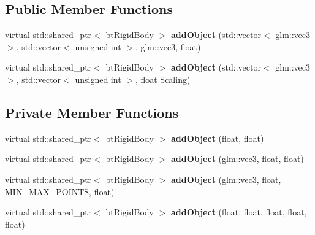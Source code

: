 \subsection*{Public Member Functions}
\begin{DoxyCompactItemize}
\item 
virtual std\+::shared\+\_\+ptr$<$ bt\+Rigid\+Body $>$ {\bfseries add\+Object} (std\+::vector$<$ glm\+::vec3 $>$, std\+::vector$<$ unsigned int $>$, glm\+::vec3, float)\hypertarget{class_physics_1_1_triangle_mesh_physic_object_a60f24807621a18f39c4d12fa3bba6a67}{}\label{class_physics_1_1_triangle_mesh_physic_object_a60f24807621a18f39c4d12fa3bba6a67}

\item 
virtual std\+::shared\+\_\+ptr$<$ bt\+Rigid\+Body $>$ {\bfseries add\+Object} (std\+::vector$<$ glm\+::vec3 $>$, std\+::vector$<$ unsigned int $>$, float Scaling)\hypertarget{class_physics_1_1_triangle_mesh_physic_object_a86750e102d5de3d98c88f36f53070191}{}\label{class_physics_1_1_triangle_mesh_physic_object_a86750e102d5de3d98c88f36f53070191}

\end{DoxyCompactItemize}
\subsection*{Private Member Functions}
\begin{DoxyCompactItemize}
\item 
virtual std\+::shared\+\_\+ptr$<$ bt\+Rigid\+Body $>$ {\bfseries add\+Object} (float, float)\hypertarget{class_physics_1_1_triangle_mesh_physic_object_a331eabf780d6f7c28c7d4433b3ac5f30}{}\label{class_physics_1_1_triangle_mesh_physic_object_a331eabf780d6f7c28c7d4433b3ac5f30}

\item 
virtual std\+::shared\+\_\+ptr$<$ bt\+Rigid\+Body $>$ {\bfseries add\+Object} (glm\+::vec3, float, float)\hypertarget{class_physics_1_1_triangle_mesh_physic_object_af9a3d30b3fc11c58153645800ab43bdc}{}\label{class_physics_1_1_triangle_mesh_physic_object_af9a3d30b3fc11c58153645800ab43bdc}

\item 
virtual std\+::shared\+\_\+ptr$<$ bt\+Rigid\+Body $>$ {\bfseries add\+Object} (glm\+::vec3, float, \hyperlink{struct_m_i_n___m_a_x___p_o_i_n_t_s}{M\+I\+N\+\_\+\+M\+A\+X\+\_\+\+P\+O\+I\+N\+TS}, float)\hypertarget{class_physics_1_1_triangle_mesh_physic_object_a6b4b88cb33616961f8ce55803d7bd2e3}{}\label{class_physics_1_1_triangle_mesh_physic_object_a6b4b88cb33616961f8ce55803d7bd2e3}

\item 
virtual std\+::shared\+\_\+ptr$<$ bt\+Rigid\+Body $>$ {\bfseries add\+Object} (float, float, float, float, float)\hypertarget{class_physics_1_1_triangle_mesh_physic_object_a66a72afa89538cef502e384c9bf973ec}{}\label{class_physics_1_1_triangle_mesh_physic_object_a66a72afa89538cef502e384c9bf973ec}

\end{DoxyCompactItemize}
